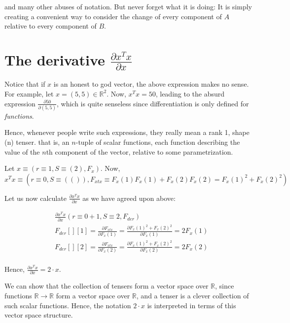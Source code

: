 \documentclass{article}
\begin{document}
and many other abuses of notation. But never forget what it is doing: It is
simply creating a convenient way to consider the change of every component of $A$
relative to every component of $B$.


\section{The derivative $\frac{\partial x^T x}{\partial x}$}

Notice that if $x$ is an honest to god vector, the above expression makes no
sense. For example, let $x = (5, 5) \in \mathbb R^2$. Now, $x^T x = 50$,
leading to the absurd expression $\frac{\partial 50}{\partial (5, 5)}$,
which is quite senseless since differentiation is only defined for \emph{functions}.

Hence, whenever people write such expressions, they really mean a rank 1, shape (n) tenser.
that is, an $n$-tuple of scalar functions, each function describing the value
of the $n$th component of the vector, relative to some parametrization.


Let $x \equiv (r \equiv 1, S \equiv (2), F_x)$. Now, 
$x^T x \equiv (r\equiv 0, S\equiv(()), F_{xtx}\equiv F_x(1) F_x(1) + F_x(2)F_x(2) = F_x(1)^2 + F_x(2)^2)$

Let us now calculate $\frac{\partial x^Tx}{\partial x}$ as we have agreed upon above:

\begin{align*}
 &\frac{\partial x^Tx}{\partial x} (r \equiv 0+1, S \equiv 2, F_{der}) \\
 &F_{der}[][1] = \frac{\partial F_{xtx}}{\partial F_x(1)}  = \frac{\partial F_x(1)^2 + F_x(2)^2}{\partial F_x(1)}
    = 2 F_x(1) \\
 &F_{der}[][2] = \frac{\partial F_{xtx}}{\partial F_x(2)}  = \frac{\partial F_x(1)^2 + F_x(2)^2}{\partial F_x(2)}
    = 2 F_x(2) \\
\end{align*}

Hence, $\frac{\partial x^Tx}{\partial x} = 2 \cdot x$.


We can show that the collection of tensers form a vector space over $\mathbb R$,
since functions $\mathbb R \rightarrow \mathbb R$ form a vector space over $\mathbb R$,
and a tenser is a clever collection of such scalar functions. Hence, the
notation $2 \cdot x$ is interpreted in terms of this vector space structure.
\end{document}
